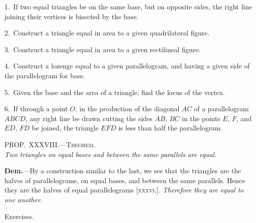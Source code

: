 \documentclass[oneside]{book}
\newcommand\myprop[2]{
\bigskip\Needspace*{4\baselineskip}\begin{center}\textsc{#1}\\\medskip\emph{#2}\par\end{center}
}
\newcommand\exhead[1]{
\Needspace*{5\baselineskip}\begin{center}
\textsf{#1}
\end{center}
}
\begin{document}
\begin{footnotesize}
1.~If two equal triangles be on the same base, but on opposite
sides, the right line joining their vertices is bisected by the base.

2.~Construct a triangle equal in area to a given quadrilateral
figure.

3.~Construct a triangle equal in area to a given rectilineal
figure.

4.~Construct a lozenge equal to a given parallelogram, and
having a given side of the parallelogram for base.

5.~Given the base and the area of a triangle, find the locus of
the vertex.

6.~If through a point $O$, in the production of the diagonal $AC$
of a parallelogram $ABCD$, any right line be drawn cutting the
sides $AB$, $BC$ in the points $E$, $F$, and $ED$, $FD$ be joined, the
triangle $EFD$ is less than half the parallelogram.
\par\end{footnotesize}


\myprop{PROP\@.~XXXVIII\@.---Theorem.}{Two triangles on equal bases and between the same
parallels are equal.}

\textbf{Dem.}---By a construction similar to the last, we see
that the triangles are the halves of parallelograms, on
equal bases, and between the same parallels. Hence
they are the halves of equal parallelograms [\textsc{xxxvi}.].
\emph{Therefore they are equal to one another.}

\exhead{Exercises.}
\end{document}
